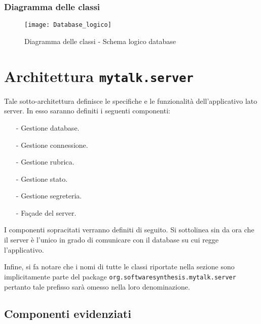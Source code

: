 \subsubsection{Diagramma delle classi}
\begin{figure}[H]
\begin{center}
\texttt{[image: Database\_logico]}
\caption{Diagramma delle classi - Schema logico database}\label{fig:database_logico}
\end{center}
\end{figure}

\clearpage

\section{Architettura \texttt{mytalk.server}}\label{sec:server}
Tale sotto-architettura definisce le specifiche e le funzionalità dell'applicativo lato server. In esso saranno definiti i seguenti componenti:
\begin{itemize}[noitemsep,nolistsep]
	\item[-] Gestione database.
	\item[-] Gestione connessione.
	\item[-] Gestione rubrica.
	\item[-] Gestione stato.
	\item[-] Gestione segreteria.
	\item[-] Façade del server.
\end{itemize}

I componenti sopracitati verranno definiti di seguito. Si sottolinea sin da ora che il server è l'unico in grado di comunicare con il database su cui regge l'applicativo.

Infine, si fa notare che i nomi di tutte le classi riportate nella sezione sono implicitamente parte del package \texttt{org.softwaresynthesis.mytalk.server} pertanto tale prefisso sarà omesso nella loro denominazione.

\subsection{Componenti evidenziati}

